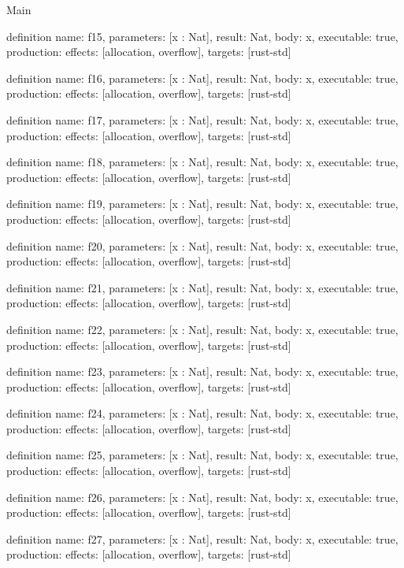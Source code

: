 \begin{lexlean}{Main}
\begin{semanticmodule}
definition{
  name: f15,
  parameters: [x : Nat],
  result: Nat,
  body: x,
  executable: true,
  production: {effects: [allocation, overflow], targets: [rust-std]}
}

definition{
  name: f16,
  parameters: [x : Nat],
  result: Nat,
  body: x,
  executable: true,
  production: {effects: [allocation, overflow], targets: [rust-std]}
}

definition{
  name: f17,
  parameters: [x : Nat],
  result: Nat,
  body: x,
  executable: true,
  production: {effects: [allocation, overflow], targets: [rust-std]}
}

definition{
  name: f18,
  parameters: [x : Nat],
  result: Nat,
  body: x,
  executable: true,
  production: {effects: [allocation, overflow], targets: [rust-std]}
}

definition{
  name: f19,
  parameters: [x : Nat],
  result: Nat,
  body: x,
  executable: true,
  production: {effects: [allocation, overflow], targets: [rust-std]}
}

definition{
  name: f20,
  parameters: [x : Nat],
  result: Nat,
  body: x,
  executable: true,
  production: {effects: [allocation, overflow], targets: [rust-std]}
}

definition{
  name: f21,
  parameters: [x : Nat],
  result: Nat,
  body: x,
  executable: true,
  production: {effects: [allocation, overflow], targets: [rust-std]}
}

definition{
  name: f22,
  parameters: [x : Nat],
  result: Nat,
  body: x,
  executable: true,
  production: {effects: [allocation, overflow], targets: [rust-std]}
}

definition{
  name: f23,
  parameters: [x : Nat],
  result: Nat,
  body: x,
  executable: true,
  production: {effects: [allocation, overflow], targets: [rust-std]}
}

definition{
  name: f24,
  parameters: [x : Nat],
  result: Nat,
  body: x,
  executable: true,
  production: {effects: [allocation, overflow], targets: [rust-std]}
}

definition{
  name: f25,
  parameters: [x : Nat],
  result: Nat,
  body: x,
  executable: true,
  production: {effects: [allocation, overflow], targets: [rust-std]}
}

definition{
  name: f26,
  parameters: [x : Nat],
  result: Nat,
  body: x,
  executable: true,
  production: {effects: [allocation, overflow], targets: [rust-std]}
}

definition{
  name: f27,
  parameters: [x : Nat],
  result: Nat,
  body: x,
  executable: true,
  production: {effects: [allocation, overflow], targets: [rust-std]}
}


\end{semanticmodule}
\end{lexlean}
